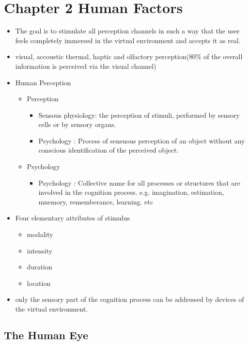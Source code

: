 \documentclass{standalone}
\begin{document}
\section{Chapter 2 Human Factors}
\begin{itemize}
	\item The goal is to stimulate all perception channels in such a way that the user feels completely immersed in the virtual environment and accepts it as real.
	\item visual, accoustic thermal, haptic and olfactory perception($80 \%$ of the overall information is perceived via the visual channel)
	\item Human Perception
	\begin{itemize}
	\item Perception
		\begin{itemize}
			\item Sensous physiology: the perception of stimuli, performed by sensory cells or by sensory organs.
			\item Psychology : Process of sensuous perception of an object without any conscious identification of the perceived object.
		\end{itemize}
	\item Psychology
		\begin{itemize}
			\item Psychology : Collective name for all processes or structures that are involved in the cognition process. e.g. imagination, estimation, mnemory, rememberance, learning. etc
		\end{itemize}
    \end{itemize}
    
    \item Four elementary attributes of stimulus
    \begin{itemize}
    		\item modality
    		\item intensity
    		\item duration
    		\item location
    \end{itemize}
    \item only the sensory part of the cognition process can be addressed by devices of the virtual environment. 
\end{itemize}

\subsection{The Human Eye}
\end{document}
